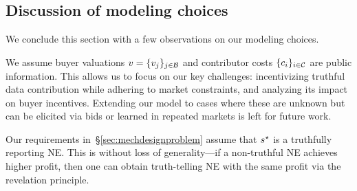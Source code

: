 \subsection{Discussion of modeling choices}
\label{sec:modelingdiscussion}


We conclude this section with a few observations on our modeling choices.


We assume buyer valuations $v = \{v_{j}\}_{j\in\mathcal{B}}$ and contributor costs $\{c_i\}_{i\in\mathcal{C}}$ are public information. This allows us to focus on our key challenges: incentivizing truthful data contribution while adhering to market constraints, and analyzing its impact on buyer incentives. Extending our model to cases where these are unknown but can be elicited via bids or learned in repeated markets is left for future work.



Our requirements in~\S\ref{sec:mechdesignproblem} assume that $s^\star$ is a truthfully reporting NE. This is without loss of generality---if a non-truthful NE achieves higher profit, then one can obtain truth-telling NE with the same profit via the revelation principle.

